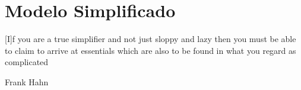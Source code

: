 
\chapter{Modelo Simplificado}\label{CapModelo}

\epigraph{[I]f you are a true simplifier and not just
sloppy and lazy then you must be able to claim to arrive at essentials which are also to be
found in what you regard as complicated}{Frank Hahn}






